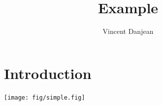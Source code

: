 \documentclass[10pt,a4paper]{article}
\author{Vincent Danjean}
\title{Example}
\date{}
\begin{document}
\maketitle

\section{Introduction}

\renewcommand{\subfigtopskip}{1pt} %
\renewcommand{\subfigcapskip}{0pt} %
\renewcommand{\subfigbottomskip}{5pt} %
\newcommand{\goodgap}{%
  \hspace{\subfigtopskip}%
  \hspace{\subfigbottomskip}%
}
\renewcommand{\topfraction}{1}
\renewcommand{\bottomfraction}{1}
\renewcommand{\textfraction}{0.1}
\texttt{[image: fig/simple.fig]}
\end{document}
